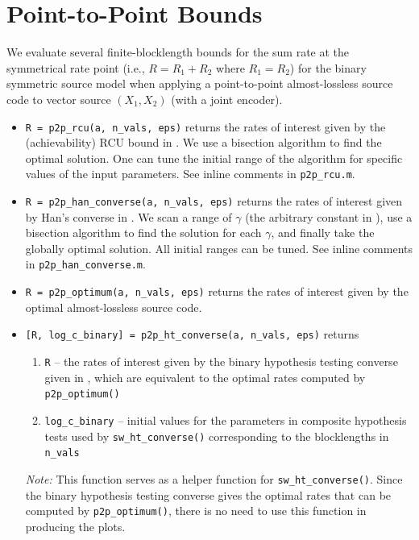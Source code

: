 \documentclass[a4paper,11p]{memoir}
\begin{document}
\section{Point-to-Point Bounds}
We evaluate several finite-blocklength bounds for the sum rate at the symmetrical rate point (i.e., $R = R_1 + R_2$ where $R_1 = R_2$) for the binary symmetric source model when applying a point-to-point almost-lossless source code to vector source $(X_1, X_2)$ (with a joint encoder). 
\begin{itemize}
\item \verb|R = p2p_rcu(a, n_vals, eps)| returns the rates of interest given by the (achievability) RCU bound in \cite[Th.~4]{CEK19}. We use a bisection algorithm to find the optimal solution. One can tune the initial range of the algorithm for specific values of the input parameters. See inline comments in \verb|p2p_rcu.m|.
\item \verb|R = p2p_han_converse(a, n_vals, eps)| returns the rates of interest given by Han's converse in \cite[Lemma~1.3.2]{HAN03}. We scan a range of $\gamma$ (the arbitrary constant in \cite[Lemma~1.3.2]{HAN03}), use a bisection algorithm to find the solution for each $\gamma$, and finally take the globally optimal solution. All initial ranges can be tuned. See inline comments in \verb|p2p_han_converse.m|.
\item \verb|R = p2p_optimum(a, n_vals, eps)| returns the rates of interest given by the optimal almost-lossless source code.
\item \verb|[R, log_c_binary] = p2p_ht_converse(a, n_vals, eps)| returns 
\begin{enumerate}
\item \verb|R| -- the rates of interest given by the binary hypothesis testing converse given in \cite[Appendix~A]{kostina2011fixed}, which are equivalent to the optimal rates computed by \verb|p2p_optimum()|
\item \verb|log_c_binary| -- initial values for the parameters in composite hypothesis tests used by \verb|sw_ht_converse()| corresponding to the blocklengths in \verb|n_vals|
\end{enumerate}
\textit{Note:} This function serves as a helper function for \verb|sw_ht_converse()|. Since the binary hypothesis testing converse gives the optimal rates that can be computed by \verb|p2p_optimum()|, there is no need to use this function in producing the plots. 
\end{itemize}
\end{document}

